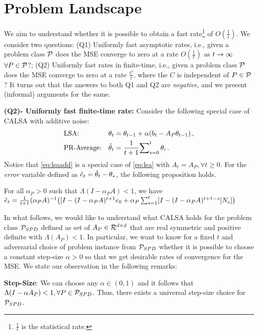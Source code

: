 \section{Problem Landscape}\label{sec:land}
We aim to understand whether it is possible to obtain a fast rate\footnote{$\frac{1}{t}$ is the statistical rate.} of $O(\frac{1}{t})$. We consider two questions: (Q1) Uniformly fast asymptotic rates, i.e., given a problem class $\P$ does the MSE converge to zero at a rate $O(\frac{1}{t})$ as $t\ra\infty$ $\forall P\in \P$?; (Q2) Uniformly fast rates in finite-time, i.e., given a problem class $\P$ does the MSE converge to zero at a rate $\frac{C}{t}$, where the $C$ is independent of $P\in\P$?
It turns out that the answers to both Q1 and Q2 are \emph{negative}, and we present (informal) arguments for the same.

\textbf{(Q2)- Uniformly fast finite-time rate:} Consider the following special case of CALSA with additive noise:
\begin{subequations}\label{eq:lsaadd}
\begin{align}
\label{conststepadd}&\text{LSA:} &\theta_t&=\theta_{t-1}+\alpha(b_t-A_P\theta_{t-1})\,,\\
\label{iteravgadd}&\text{PR-Average:} &\thh_t&=\frac{1}{t+1}{\sum}_{s=0}^{t}\,\theta_i\,.
\end{align}
\end{subequations}
Notice that \eqref{eq:lsaadd} is a special case of \eqref{eq:lsa} with $A_t=A_P,\forall t\geq 0$. For the \emph{error} variable defined as $\eh_t\eqdef\thh_t-\ts$, the following proposition holds.
\begin{proposition}\label{prop:erradd}
For all $\alpha_P>0$ such that $\Lambda(I-\alpha_P A)<1$, we have
$
\eh_t=\frac{1}{t+1}(\alpha_P A)^{-1}\big([I-(I-\alpha_P A)^{t+1}e_0
+\alpha_P\sum_{s=1}^t [I-(I-\alpha_P A)^{t+1-s}] N_s]\big)
$
\end{proposition}
In what follows, we would like to understand what CALSA holds for the problem class $\P_{SPD}$ defined as set of $A_P\in \R^{\dcd}$ that are real symmetric and positive definite with $\Lambda(A_P)<1$. In particular, we want to know for a fixed $t$ and adversarial choice of problem instance from $\P_{SPD}$ whether it is possible to choose a constant step-size $\alpha>0$ so that we get desirable rates of convergence for the MSE.  
We state our observation in the following remarks:

\textbf{Step-Size}: We can choose any $\alpha\in(0,1)$ and it follows that $\Lambda(I-\alpha A_P)<1, \forall P\in \P_{SPD}$. Thus, there exists a universal step-size choice for $\P_{SPD}$.

